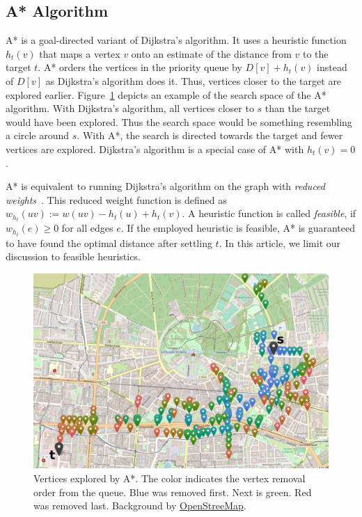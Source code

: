 \documentclass[manuscript]{acmart}
\begin{document}
\subsection{A* Algorithm}\label{sec:a_star}

A* is a goal-directed variant of Dijkstra's algorithm.
It uses a heuristic function $h_t(v)$ that maps a vertex $v$ onto an estimate of the distance from $v$ to the target $t$.
A* orders the vertices in the priority queue by $D[v] + h_t(v)$ instead of $D[v]$ as Dijkstra's algorithm does it.
Thus, vertices closer to the target are explored earlier.
Figure~\ref{img:search-space} depicts an example of the search space of the A* algorithm.
With Dijkstra's algorithm, all vertices closer to $s$ than the target would have been explored.
Thus the search space would be something resembling a circle around $s$.
With A*, the search is directed towards the target and fewer vertices are explored.
Dijkstra's algorithm is a special case of A* with $h_t(v)=0$.

A* is equivalent to running Dijkstra's algorithm on the graph with \emph{reduced weights}~\cite{hnr-afbhd-68}.
This reduced weight function is defined as $w_{h_t}(uv) := w(uv) - h_t(u) + h_t(v)$.
A heuristic function is called \emph{feasible}, if $w_{h_t}(e) \geq 0$ for all edges $e$.
If the employed heuristic is feasible, A* is guaranteed to have found the optimal distance after settling $t$.
In this article, we limit our discussion to feasible heuristics.

\begin{figure}
\centering
\includegraphics[width=.6\columnwidth]{fig/searchspace_st.png}
\caption{Vertices explored by A*. The color indicates the vertex removal order from the queue. Blue was removed first. Next is green. Red was removed last. Background by \href{https://www.openstreetmap.org/copyright}{OpenStreeMap}.}
\label{img:search-space}
\end{figure}
\end{document}
